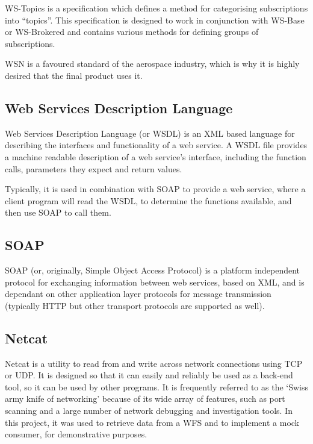 \documentclass[a4paper, 12pt, twoside]{article}
\begin{document}
WS-Topics is a specification which defines a method for categorising subscriptions into ``topics''. This specification is designed to work in conjunction with WS-Base or WS-Brokered and contains various methods for defining groups of subscriptions.

WSN is a favoured standard of the aerospace industry, which is why it is highly desired that the final product uses it.

\subsection{Web Services Description Language}
\label{sec:bg_wsdl}

Web Services Description Language (or WSDL) is an XML based language for describing the interfaces and functionality of a web service\cite{christensen2001web}. A WSDL file provides a machine readable description of a web service's interface, including the function calls, parameters they expect and return values.

Typically, it is used in combination with SOAP to provide a web service, where a client program will read the WSDL, to determine the functions available, and then use SOAP to call them\cite{curbera2002unraveling}.

\subsection{SOAP}
\label{sec:bg_soap}

SOAP (or, originally, Simple Object Access Protocol) is a platform independent protocol for exchanging information between web services, based on XML, and is dependant on other application layer protocols for message transmission (typically HTTP but other transport protocols are supported as well)\cite{curbera2002unraveling}.

\subsection{Netcat}
\label{sec:bg_netcat}

Netcat is a utility to read from and write across network connections using TCP or UDP. It is designed so that it can easily and reliably be used as a back-end tool, so it can be used by other programs. It is frequently referred to as the `Swiss army knife of networking' because of its wide array of features, such as port scanning and a large number of network debugging and investigation tools. In this project, it was used to retrieve data from a WFS and to implement a mock consumer, for demonstrative purposes.
\end{document}
